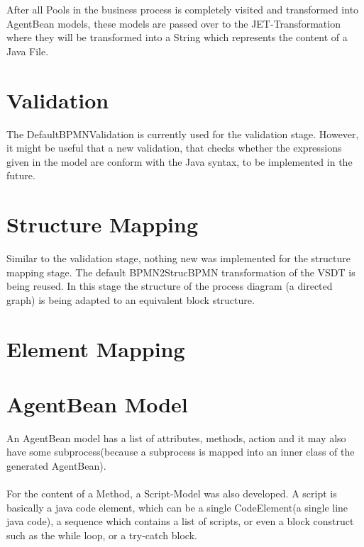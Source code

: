 After all Pools in the business process is completely visited and transformed into AgentBean models, these models are passed over to the JET-Transformation where they will be transformed into a String which represents the content of a Java File. 

\section{Validation}
The DefaultBPMNValidation is currently used for the validation stage. However, it might be useful that a new validation, that checks whether the expressions given in the model are conform with the Java syntax, to be implemented in the future.

\section{Structure Mapping}
Similar to the validation stage, nothing new was implemented for the structure mapping stage. The default BPMN2StrucBPMN transformation of the VSDT is being reused. In this stage the structure of the process diagram (a directed graph) is being adapted to an equivalent block structure.  

\section{Element Mapping}

\section{AgentBean Model}

An AgentBean model has a list of attributes, methods, action and it may also have some subprocess(because a subprocess is mapped into an inner class of the generated AgentBean).\\\\
For the content of a Method, a Script-Model was also developed. A script is basically a java code element, which can be a single CodeElement(a single line java code), a sequence which contains a list of scripts, or even a block construct such as the while loop, or a try-catch block. 

